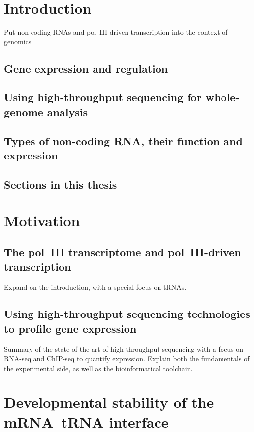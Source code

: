 \section{Introduction}

Put non-coding RNAs and pol~III-driven transcription into the context of genomics.

\subsection{Gene expression and regulation}

\subsection{Using high-throughput sequencing for whole-genome analysis}

\subsection{Types of non-coding RNA, their function and expression}

\subsection{Sections in this thesis}

\section{Motivation}

\subsection{The pol~III transcriptome and pol~III-driven transcription}

Expand on the introduction, with a special focus on tRNAs.

\subsection{Using high-throughput sequencing technologies to profile gene expression}

Summary of the state of the art of high-throughput sequencing with a focus on
RNA-seq and ChIP-seq to quantify expression. Explain both the fundamentals of
the experimental side, as well as the bioinformatical toolchain.

\section{Developmental stability of the mRNA–tRNA interface}

